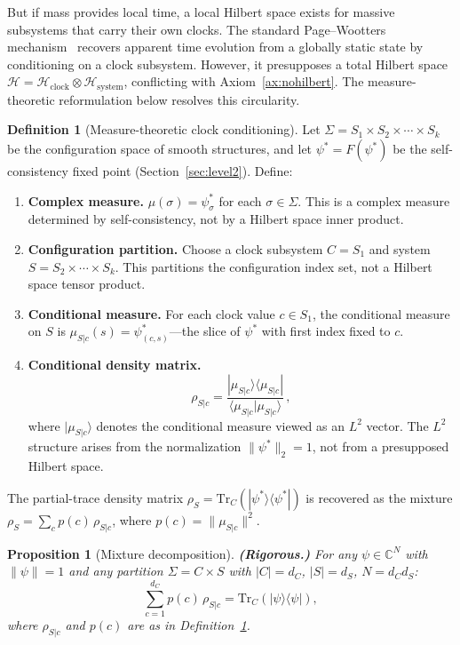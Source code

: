 \documentclass[12pt,a4paper]{article}
\newtheorem{proposition}{Proposition}
\theoremstyle{definition}
\newtheorem{definition}{Definition}
\theoremstyle{remark}
\begin{document}
But if mass provides local time, a local Hilbert space exists for massive
subsystems that carry their own clocks. The standard Page--Wootters
mechanism~\cite{page_wootters} recovers apparent time evolution from a
globally static state by conditioning on a clock subsystem. However, it
presupposes a total Hilbert space $\mathcal{H} = \mathcal{H}_{\mathrm{clock}}
\otimes \mathcal{H}_{\mathrm{system}}$, conflicting with
Axiom~\ref{ax:nohilbert}. The measure-theoretic reformulation below
resolves this circularity.

\begin{definition}[Measure-theoretic clock conditioning]
\label{def:measure_pw}
Let $\Sigma = S_1 \times S_2 \times \cdots \times S_k$ be the configuration
space of smooth structures, and let $\psi^* = F(\psi^*)$ be the
self-consistency fixed point (Section~\ref{sec:level2}). Define:
\begin{enumerate}
\item \textbf{Complex measure.} $\mu(\sigma) = \psi^*_\sigma$ for each
  $\sigma \in \Sigma$. This is a complex measure determined by
  self-consistency, not by a Hilbert space inner product.
\item \textbf{Configuration partition.} Choose a clock subsystem $C = S_1$
  and system $S = S_2 \times \cdots \times S_k$. This partitions the
  configuration index set, not a Hilbert space tensor product.
\item \textbf{Conditional measure.} For each clock value $c \in S_1$,
  the conditional measure on $S$ is
  $\mu_{S|c}(s) = \psi^*_{(c,s)}$---the slice of $\psi^*$ with first
  index fixed to $c$.
\item \textbf{Conditional density matrix.}
\begin{equation}
\rho_{S|c} = \frac{|\mu_{S|c}\rangle\langle\mu_{S|c}|}
  {\langle\mu_{S|c}|\mu_{S|c}\rangle}\,,
\label{eq:cond_dm}
\end{equation}
where $|\mu_{S|c}\rangle$ denotes the conditional measure viewed as an
$L^2$ vector. The $L^2$ structure arises from the normalization
$\|\psi^*\|_2 = 1$, not from a presupposed Hilbert space.
\end{enumerate}
The partial-trace density matrix $\rho_S = \mathrm{Tr}_C(|\psi^*\rangle
\langle\psi^*|)$ is recovered as the mixture
$\rho_S = \sum_c p(c)\,\rho_{S|c}$, where $p(c) = \|\mu_{S|c}\|^2$.
\end{definition}

\begin{proposition}[Mixture decomposition]
\textbf{(Rigorous.)}
\label{prop:mixture}
For any $\psi \in \mathbb{C}^N$ with $\|\psi\| = 1$ and any partition
$\Sigma = C \times S$ with $|C| = d_C$, $|S| = d_S$, $N = d_C d_S$:
\[
\sum_{c=1}^{d_C} p(c)\, \rho_{S|c} =
\mathrm{Tr}_C\!\left(|\psi\rangle\langle\psi|\right),
\]
where $\rho_{S|c}$ and $p(c)$ are as in Definition~\ref{def:measure_pw}.
\end{proposition}
\end{document}
